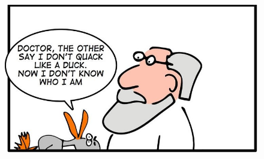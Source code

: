 \documentclass[xcolor ={table,usenames,dvipsnames}]{beamer}
\theoremstyle{definition}
\begin{document}
\begin{frame}[fragile]
	\begin{figure}[h!]
		\centering
		\includegraphics[scale=0.4]{img/doctor.jpg}
		\label{Interfacce di un CS}
	\end{figure}
\end{frame}




	

		
	
	

	
	
	
	
	
	
	
	
	
	
	
\end{document}
